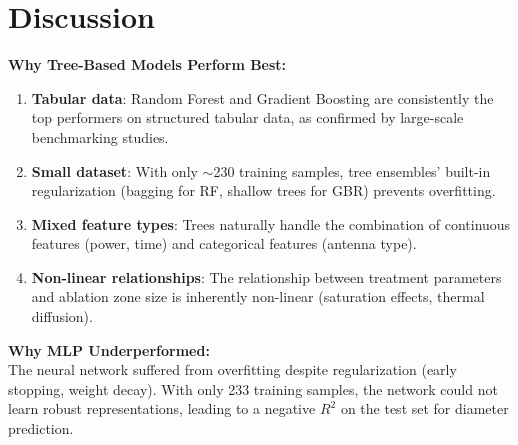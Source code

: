 \section{Discussion}

\noindent\textbf{Why Tree-Based Models Perform Best:}
\begin{enumerate}
    \item \textbf{Tabular data}: Random Forest and Gradient Boosting are consistently the top performers on structured tabular data, as confirmed by large-scale benchmarking studies.
    \item \textbf{Small dataset}: With only $\sim$230 training samples, tree ensembles' built-in regularization (bagging for RF, shallow trees for GBR) prevents overfitting.
    \item \textbf{Mixed feature types}: Trees naturally handle the combination of continuous features (power, time) and categorical features (antenna type).
    \item \textbf{Non-linear relationships}: The relationship between treatment parameters and ablation zone size is inherently non-linear (saturation effects, thermal diffusion).
\end{enumerate}

\noindent\textbf{Why MLP Underperformed:}\\
The neural network suffered from overfitting despite regularization (early stopping, weight decay). With only 233 training samples, the network could not learn robust representations, leading to a negative $R^2$ on the test set for diameter prediction.
